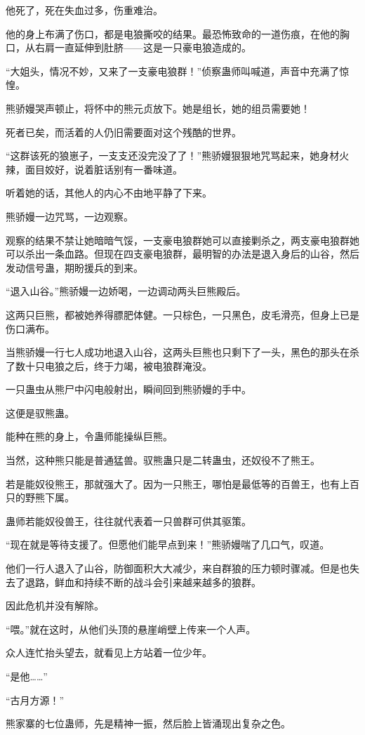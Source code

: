 \begin{this_body}
他死了，死在失血过多，伤重难治。

他的身上布满了伤口，都是电狼撕咬的结果。最恐怖致命的一道伤痕，在他的胸口，从右肩一直延伸到肚脐——这是一只豪电狼造成的。

“大姐头，情况不妙，又来了一支豪电狼群！”侦察蛊师叫喊道，声音中充满了惊惶。

熊骄嫚哭声顿止，将怀中的熊元贞放下。她是组长，她的组员需要她！

死者已矣，而活着的人仍旧需要面对这个残酷的世界。

“这群该死的狼崽子，一支支还没完没了了！”熊骄嫚狠狠地咒骂起来，她身材火辣，面目姣好，说着脏话别有一番味道。

听着她的话，其他人的内心不由地平静了下来。

熊骄嫚一边咒骂，一边观察。

观察的结果不禁让她暗暗气馁，一支豪电狼群她可以直接剿杀之，两支豪电狼群她可以杀出一条血路。但现在四支豪电狼群，最明智的办法是退入身后的山谷，然后发动信号蛊，期盼援兵的到来。

“退入山谷。”熊骄嫚一边娇喝，一边调动两头巨熊殿后。

这两只巨熊，都被她养得膘肥体健。一只棕色，一只黑色，皮毛滑亮，但身上已是伤口满布。

当熊骄嫚一行七人成功地退入山谷，这两头巨熊也只剩下了一头，黑色的那头在杀了数十只电狼之后，终于力竭，被电狼群淹没。

一只蛊虫从熊尸中闪电般射出，瞬间回到熊骄嫚的手中。

这便是驭熊蛊。

能种在熊的身上，令蛊师能操纵巨熊。

当然，这种熊只能是普通猛兽。驭熊蛊只是二转蛊虫，还奴役不了熊王。

若是能奴役熊王，那就强大了。因为一只熊王，哪怕是最低等的百兽王，也有上百只的野熊下属。

蛊师若能奴役兽王，往往就代表着一只兽群可供其驱策。

“现在就是等待支援了。但愿他们能早点到来！”熊骄嫚喘了几口气，叹道。

他们一行人退入了山谷，防御面积大大减少，来自群狼的压力顿时骤减。但是也失去了退路，鲜血和持续不断的战斗会引来越来越多的狼群。

因此危机并没有解除。

“喂。”就在这时，从他们头顶的悬崖峭壁上传来一个人声。

众人连忙抬头望去，就看见上方站着一位少年。

“是他……”

“古月方源！”

熊家寨的七位蛊师，先是精神一振，然后脸上皆涌现出复杂之色。

\end{this_body}


